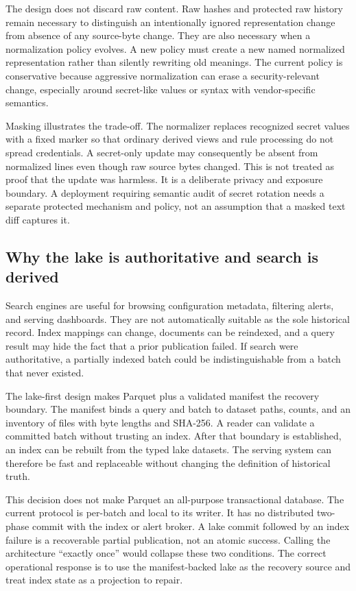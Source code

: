 \documentclass[a4paper,11pt]{article}
\begin{document}
The design does not discard raw content. Raw hashes and protected raw history remain necessary to distinguish an intentionally ignored representation change from absence of any source-byte change. They are also necessary when a normalization policy evolves. A new policy must create a new named normalized representation rather than silently rewriting old meanings. The current policy is conservative because aggressive normalization can erase a security-relevant change, especially around secret-like values or syntax with vendor-specific semantics.

Masking illustrates the trade-off. The normalizer replaces recognized secret values with a fixed marker so that ordinary derived views and rule processing do not spread credentials. A secret-only update may consequently be absent from normalized lines even though raw source bytes changed. This is not treated as proof that the update was harmless. It is a deliberate privacy and exposure boundary. A deployment requiring semantic audit of secret rotation needs a separate protected mechanism and policy, not an assumption that a masked text diff captures it.

\subsection{Why the lake is authoritative and search is derived}

Search engines are useful for browsing configuration metadata, filtering alerts, and serving dashboards. They are not automatically suitable as the sole historical record. Index mappings can change, documents can be reindexed, and a query result may hide the fact that a prior publication failed. If search were authoritative, a partially indexed batch could be indistinguishable from a batch that never existed.

The lake-first design makes Parquet plus a validated manifest the recovery boundary. The manifest binds a query and batch to dataset paths, counts, and an inventory of files with byte lengths and SHA-256. A reader can validate a committed batch without trusting an index. After that boundary is established, an index can be rebuilt from the typed lake datasets. The serving system can therefore be fast and replaceable without changing the definition of historical truth.

This decision does not make Parquet an all-purpose transactional database. The current protocol is per-batch and local to its writer. It has no distributed two-phase commit with the index or alert broker. A lake commit followed by an index failure is a recoverable partial publication, not an atomic success. Calling the architecture ``exactly once'' would collapse these two conditions. The correct operational response is to use the manifest-backed lake as the recovery source and treat index state as a projection to repair.
\end{document}
